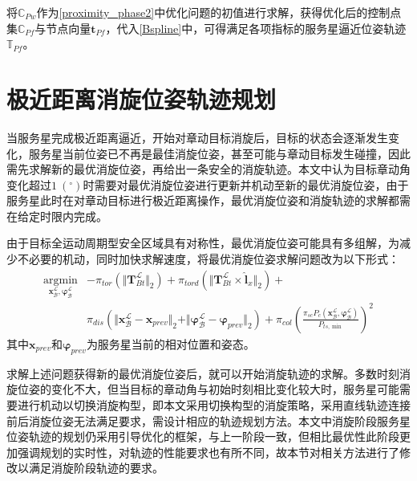 \documentclass[lang=chs, degree=master, blindreview=false, winfonts=true]{yanputhesis}
\begin{document}
将$\mathbb{C}_{Pw}$作为\autoref{proximity_phase2}中优化问题的初值进行求解，获得优化后的控制点集$\mathbb{C}_{Pf}$与节点向量$\boldsymbol{t}_{Pf}$，代入\autoref{Bspline}中，可得满足各项指标的服务星逼近位姿轨迹$\mathbb{T}_{Pf}$。

\section{极近距离消旋位姿轨迹规划}
当服务星完成极近距离逼近，开始对章动目标消旋后，目标的状态会逐渐发生变化，服务星当前位姿已不再是最佳消旋位姿，甚至可能与章动目标发生碰撞，因此需先求解新的最优消旋位姿，再给出一条安全的消旋轨迹。本文中认为目标章动角变化超过$1\ (^{\circ})$时需要对最优消旋位姿进行更新并机动至新的最优消旋位姿，由于服务星此时在对章动目标进行极近距离操作，最优消旋位姿和消旋轨迹的求解都需在给定时限内完成。

由于目标全运动周期型安全区域具有对称性，最优消旋位姿可能具有多组解，为减少不必要的机动，同时加快求解速度，将最优消旋位姿求解问题改为以下形式：
\begin{equation}
	\begin{aligned}
		\mathop{\arg\min}\limits_{{\boldsymbol{x}_{\mathcal{B}}^{\mathcal{L}}},{\boldsymbol{\varphi}_{\mathcal{B}}^{\mathcal{L}}}} &-\pi_{tor}\left(\Vert \boldsymbol{T}^{\mathcal{L}}_{Bt}\Vert_2 \right)+\pi_{tord}\left(\Vert \boldsymbol{T}^{\mathcal{L}}_{Bt} \times {\boldsymbol{\hat l}}_x \Vert_2\right)+\\
		&\pi_{dis}\left(\Vert {\boldsymbol{x}_{\mathcal{B}}^{\mathcal{L}}}-\boldsymbol{x}_{prev} \Vert_2+\Vert {\boldsymbol{\varphi}_{\mathcal{B}}^{\mathcal{L}}}-\boldsymbol{\varphi}_{prev} \Vert_2\right)+\pi_{col}\left(\frac{\pi_{sc} P_c({\boldsymbol{x}_{\mathcal{B}}^{\mathcal{L}}},{\boldsymbol{\varphi}_{\mathcal{B}}^{\mathcal{L}}})}{P_{ts,\min}}\right)^2
	\end{aligned}
\end{equation}
其中$\boldsymbol{x}_{prev}$和$\boldsymbol{\varphi}_{prev}$为服务星当前的相对位置和姿态。

求解上述问题获得新的最优消旋位姿后，就可以开始消旋轨迹的求解。多数时刻消旋位姿的变化不大，但当目标的章动角与初始时刻相比变化较大时，服务星可能需要进行机动以切换消旋构型，即本文采用切换构型的消旋策略，采用直线轨迹连接前后消旋位姿无法满足要求，需设计相应的轨迹规划方法。本文中消旋阶段服务星位姿轨迹的规划仍采用引导优化的框架，与上一阶段一致，但相比最优性此阶段更加强调规划的实时性，对轨迹的性能要求也有所不同，故本节对相关方法进行了修改以满足消旋阶段轨迹的要求。
\end{document}
